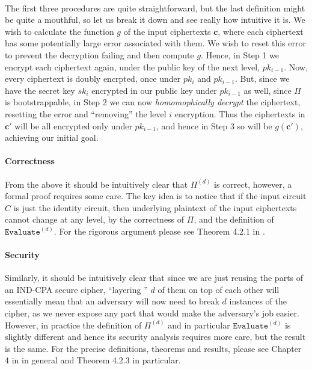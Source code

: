 \documentclass{article}
\theoremstyle{definition}
\theoremstyle{example}
\newcommand{\Evaluate}{\texttt{Evaluate}}
\renewcommand{\vec}[1]{\mathbf{#1}}
\begin{document}
\paragraph{} The first three procedures are quite straightforward, but the last
definition might be quite a mouthful, so let us break it down and see really how
intuitive it is. We wish to calculate the function $g$ of the input ciphertexts
$\vec{c}$, where each ciphertext has some potentially large error associated
with them. We wish to reset this error to prevent the decryption failing and
then compute $g$. Hence, in Step 1 we encrypt each ciphertext again, under the public key
of the next level, $pk_{i-1}$. Now, every ciphertext is doubly encrpted, once
under $pk_i$ and $pk_{i-1}$. But, since we have the secret key $sk_i$ encrypted
in our public key under $pk_{i-1}$ as well, since $\Pi$ is bootstrappable, in
Step 2 we
can now \textit{homomophically decrypt} the ciphertext, resetting the error and
``removing'' the level $i$ encryption. Thus the ciphertexts in $\vec{c}'$ will
be all encrypted only under $pk_{i - 1}$, and hence in Step 3 so will be
$g(\vec{c}')$, achieving our initial goal.
\paragraph{Correctness} From the above it should be intuitively clear that
$\Pi^{(d)}$ is correct, however, a formal proof requires some care. The key idea
is to notice that if the input circuit $C$ is just the identity circuit, then
underlying plaintext of the input ciphertexts cannot change at any level, by the
correctness of $\Pi$, and the definition of $\Evaluate^{(d)}$. For the rigorous
argument please see Theorem 4.2.1 in \cite{gentry2009fully}.
\paragraph{Security} Similarly, it should be intuitively clear that since we are
just reusing the parts of an IND-CPA secure cipher, ``layering '' $d$ of them
on top of each other will essentially mean that an adversary will now need to
break $d$ instances of the cipher, as we never expose any part that would make
the adversary's job easier. However, in practice the definition of
$\Pi^{(d)}$ and in particular $\Evaluate^{(d)}$ is slightly different and hence
its security analysis requires more care, but the result is the same. For the
precise definitions, theorems and results, please see Chapter 4 in
\cite{gentry2009fully} in general and Theorem 4.2.3 in particular.
\end{document}
